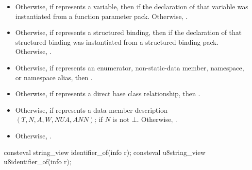 \begin{itemdescr}
\begin{itemize}
   if
  \begin{itemize}
  \item
    there is a declaration $D$ in $S$ that introduces a name $N$ for either $P$
    or the parameter corresponding to $P$
    in the templated function that $D$ declares and
  \item
    no declaration in $S$ does so using any name other than $N$.
  \end{itemize}
  Otherwise, .
  \begin{example}
\begin{codeblock}
void fun(int);
constexpr std::meta::info r = parameters_of(^^fun)[0];
static_assert(!has_identifier(r));

void fun(int x);
static_assert(has_identifier(r));

void fun(int x);
static_assert(has_identifier(r));

void poison() {
  void fun(int y);
}
static_assert(!has_identifier(r));
\end{codeblock}
  \end{example}
\item
  Otherwise, if  represents a variable,
  then  if the declaration of that variable
  was instantiated from a function parameter pack.
  Otherwise, .
\item
  Otherwise, if  represents a structured binding,
  then  if the declaration of that structured binding
  was instantiated from a structured binding pack.
  Otherwise, .
\item
  Otherwise, if  represents an
  enumerator,
  non-static-data member,
  namespace, or
  namespace alias,
  then .
\item
  Otherwise, if  represents a direct base class relationship,
  then .
\item
  Otherwise, if  represents a data member description
  $(T, N, A, W, \mathit{NUA}, \mathit{ANN})$;
   if $N$ is not $\bot$.
  Otherwise, .
\item
  Otherwise, .
\end{itemize}
\end{itemdescr}

%
%
\begin{itemdecl}
consteval string_view identifier_of(info r);
consteval u8string_view u8identifier_of(info r);
\end{itemdecl}

